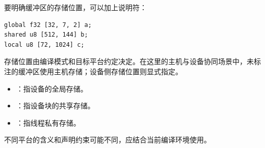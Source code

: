 要明确缓冲区的存储位置，可以加上说明符：

\begin{lstlisting}[language=croqtile,caption={存储说明符}]
global f32 [32, 7, 2] a;
shared u8 [512, 144] b;
local u8 [72, 1024] c;
\end{lstlisting}

存储位置由编译模式和目标平台约定决定。在这里的主机与设备协同场景中，未标注的缓冲区使用主机存储；设备侧存储位置则显式指定。

\begin{itemize}[leftmargin=1.6em]
\item \co@global@：指设备的全局存储。
\item \co@shared@：指设备块的共享存储。
\item \co@local@：指线程私有存储。
\end{itemize}

不同平台的含义和声明约束可能不同，应结合当前编译环境使用。
